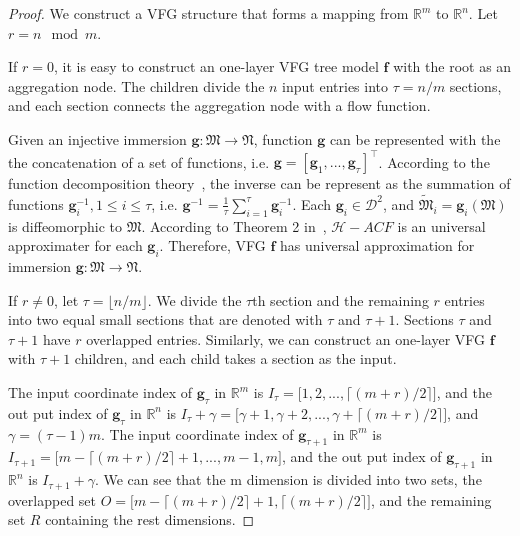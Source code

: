 \documentclass[sigconf, anonymous, review]{acmart}
\theoremstyle{plain}
\theoremstyle{definition}
\theoremstyle{remark}
\begin{document}
\begin{proof}

We  construct a VFG structure that forms a mapping from $\mathbb{R}^m$ to $\mathbb{R}^n$.  Let $r=n\mod m$. 

If  $r =0$, it is easy to construct an one-layer  VFG tree model $\mathbf{f}$ with  the root as an aggregation node. The children divide the $n$ input entries into $\tau = n/m$ sections, and each section  connects the aggregation node with a flow function. 



Given an injective immersion $\mathbf{g}:\mathfrak{M}  \rightarrow \mathfrak{N}$, function $\mathbf{g}$ can be represented with the the concatenation of a set of functions, i.e.  $\mathbf{g}=[\mathbf{g}_1, ..., \mathbf{g}_{\tau}]^{\top}$. According to the function decomposition theory~\cite{kuo2010decompositions}, the inverse  can be represent as the summation of  functions $\mathbf{g}^{-1}_{i}, 1\leq i \leq \tau$, i.e. $\mathbf{g}^{-1} = \frac{1}{\tau} \sum_{i=1}^{\tau} \mathbf{g}^{-1}_{i}$. Each $\mathbf{g}_{i} \in \mathcal{D}^2$, and $\tilde{\mathfrak{M}}_{i} = \mathbf{g}_{i}(\mathfrak{M})$ is diffeomorphic to $\mathfrak{M}$. According to  Theorem 2 in~\cite{Takeshi2020}, $\mathcal{H}-ACF$ is  an  universal approximater  for each $\mathbf{g}_{i} $. Therefore,  VFG $\mathbf{f}$ has  universal approximation for immersion $\mathbf{g}:\mathfrak{M}  \rightarrow \mathfrak{N}$. 



If $r \neq 0$, let $\tau = \lfloor n/m \rfloor$. We  divide the  $\tau$th section and the remaining $r$ entries into two equal small sections that are denoted with $\tau$ and $\tau +1$. Sections $\tau$ and $\tau +1$ have  $r$  overlapped entries. Similarly, we can construct an one-layer VFG $\mathbf{f}$ with $\tau +1$ children,  and  each child takes a section as the input.

The input coordinate index of $\mathbf{g}_{\tau}$ in $\mathbb{R}^m$ is $I_{\tau} = \big[1,2,..., \lceil (m+r)/2 \rceil \big]$, and the out put index of $\mathbf{g}_{\tau}$  in $\mathbb{R}^n$  is $I_{\tau} + \gamma = \big[\gamma + 1, \gamma + 2,...,  \gamma + \lceil (m+r)/2 \rceil \big]$, and $\gamma = (\tau-1)m$. The input coordinate index of $\mathbf{g}_{\tau+1}$ in $\mathbb{R}^m$ is $I_{\tau + 1} = \big[m- \lceil (m+r)/2 \rceil + 1, ..., m-1, m \big]$, and the out put index of $\mathbf{g}_{\tau +1}$  in $\mathbb{R}^n$  is $I_{\tau+1} + \gamma $.   We can see that the m dimension is divided into two sets, the overlapped set $O = \big[ m- \lceil (m+r)/2 \rceil + 1, \lceil (m+r)/2 \rceil  \big]$, and the remaining set $R$ containing the rest dimensions. 


\end{proof}
\end{document}
